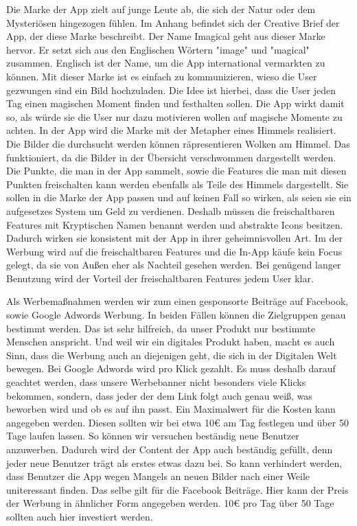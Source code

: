Die Marke der App zielt auf junge Leute ab, die sich der Natur oder dem Mysteriösen hingezogen fühlen. Im Anhang befindet sich der Creative Brief der App, der diese Marke beschreibt.
Der Name Imagical geht aus dieser Marke hervor. Er setzt sich aus den Englischen Wörtern "image" und "magical" zusammen. Englisch ist der Name, um die App international vermarkten zu können.
Mit dieser Marke ist es einfach zu kommunizieren, wieso die User gezwungen sind ein Bild hochzuladen. Die Idee ist hierbei, dass die User jeden Tag einen magischen Moment finden und festhalten sollen. Die App wirkt damit so, als würde sie die User nur dazu motivieren wollen auf magische Momente zu achten.
In der App wird die Marke mit der Metapher eines Himmels realisiert. Die Bilder die durchsucht werden können räpresentieren Wolken am Himmel. Das funktioniert, da die Bilder in der Übersicht verschwommen dargestellt werden. Die Punkte, die man in der App sammelt, sowie die Features die man mit diesen Punkten freischalten kann werden ebenfalls als Teile des Himmels dargestellt. Sie sollen in die Marke der App passen und auf keinen Fall so wirken, als seien sie ein aufgesetzes System um Geld zu verdienen. Deshalb müssen die freischaltbaren Features mit Kryptischen Namen benannt werden und abstrakte Icons besitzen. Dadurch wirken sie konsistent mit der App in ihrer geheimnisvollen Art.
Im der Werbung wird auf die freischaltbaren Features und die In-App käufe kein Focus gelegt, da sie von Außen eher als Nachteil gesehen werden. Bei genügend langer Benutzung wird der Vorteil der freischaltbaren Features jedem User klar.

Als Werbemaßnahmen werden wir zum einen gesponsorte Beiträge auf Facebook, sowie Google Adwords Werbung. In beiden Fällen können die Zielgruppen genau bestimmt werden. Das ist sehr hilfreich, da unser Produkt nur bestimmte Menschen anspricht. Und weil wir ein digitales Produkt haben, macht es auch Sinn, dass die Werbung auch an diejenigen geht, die sich in der Digitalen Welt bewegen.
Bei Google Adwords wird pro Klick gezahlt. Es muss deshalb darauf geachtet werden, dass unsere Werbebanner nicht besonders viele Klicks bekommen, sondern, dass jeder der dem Link folgt auch genau weiß, was beworben wird und ob es auf ihn passt. Ein Maximalwert für die Kosten kann angegeben werden. Diesen sollten wir bei etwa 10€ am Tag festlegen und über 50 Tage laufen lassen. So können wir versuchen beständig neue Benutzer anzuwerben. Dadurch wird der Content der App auch beständig gefüllt, denn jeder neue Benutzer trägt als erstes etwas dazu bei. So kann verhindert werden, dass Benutzer die App wegen Mangels an neuen Bilder nach einer Weile uniteressant finden.
Das selbe gilt für die Facebook Beiträge. Hier kann der Preis der Werbung in ähnlicher Form angegeben werden. 10€ pro Tag über 50 Tage sollten auch hier investiert werden.

